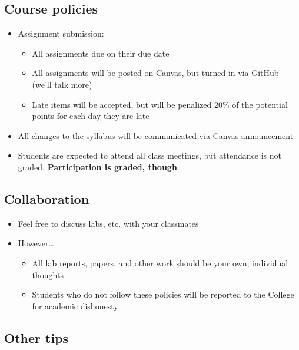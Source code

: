 \documentclass[
  letterpaper,
  DIV=11,
  numbers=noendperiod]{scrartcl}
\providecommand{\tightlist}{%
  \setlength{\itemsep}{0pt}\setlength{\parskip}{0pt}}
\begin{document}
\subsection{Course policies}\label{course-policies}

\begin{itemize}
\item
  Assignment submission:

  \begin{itemize}
  \item
    All assignments due on their due date
  \item
    All assignments will be posted on Canvas, but turned in via GitHub
    (we'll talk more)
  \item
    Late items will be accepted, but will be penalized 20\% of the
    potential points for each day they are late
  \end{itemize}
\item
  All changes to the syllabus will be communicated via Canvas
  announcement
\item
  Students are expected to attend all class meetings, but attendance is
  not graded. \textbf{Participation is graded, though}
\end{itemize}

\subsection{Collaboration}\label{collaboration}

\begin{itemize}
\tightlist
\item
  Feel free to discuss labs, etc. with your classmates
\item
  However\ldots{}

  \begin{itemize}
  \tightlist
  \item
    All lab reports, papers, and other work should be your own,
    individual thoughts
  \item
    Students who do not follow these policies will be reported to the
    College for academic dishonesty
  \end{itemize}
\end{itemize}

\subsection{Other tips}\label{other-tips}
\end{document}

